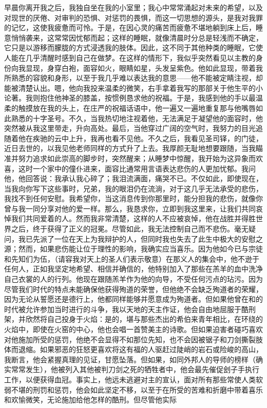 早晨你离开我之后，我独自坐在我的小室里；我心中常常涌起对未来的希望，以及对现世的厌倦、对审判的恐惧、对惩罚的畏惧，而这一切思想的源头，是我对我罪的记忆，这使我疲惫而可怜。于是，在因心灵的痛苦而疲惫不堪地躺到床上后，睡意悄悄袭来，这常常因忧郁而起；这样的睡眠，就像清晨时分总是轻浅而不确定，它只是以游移而朦胧的方式浸透我的肢体。因此，这不同于其他种类的睡眠，它使人能在几乎清醒时感到自己在做梦。在这样的情形下，我似乎突然看见以主教的身份向我显现，身穿白袍，面容如火，眼睛如星，头发呈紫色。他如此显现，带着我所熟悉的容貌和身形，以至于我几乎难以表达我的意思——他不能被定睛注视，却能被清楚认出。嗯，他向我投来温柔的微笑，右手拿着我写的那部关于他生平的小论著。我则抱住他神圣的膝盖，按惯例恳求他的祝福。于是，我感到他的手以最温柔的触摸放在我的头上，在庄严的祝福话语中，他一遍又一遍地重复那与他嘴唇如此熟悉的十字圣号。不久，当我热切地注视着他，无法满足于凝望他的面容时，他突然被从我这里带走，升向高处。最后，当他穿过广阔的空气时，我努力的目光追随着他在疾驰的云中上升，我再也看不见他。不久之后，我看见圣司铎，的门徒，近日去世的，以我见他老师同样的方式升了上去。我厚颜无耻地想要跟随，当我瞄准并努力追求如此崇高的脚步时，突然醒来；从睡梦中惊醒，我开始为这异象而欢喜，这时一个家中的僮仆进来，面容比通常用言语表达悲伤的人更加忧郁。我问他，他回答说：我承认我心碎了；我泪流满面，痛哭不已。不仅如此，即使现在，当我向你写下这些事时，兄弟，我的眼泪仍在流淌，对于这几乎无法承受的悲伤，我找不到任何安慰。我希望你，当这消息传到你那里时，能分担我的悲伤，就像你曾与我一同分享对他的爱一样。那么，我恳求你，立即到我这里来，让我们共同哀悼我们共同爱着的人。然而我非常清楚，这样的人不应被哀悼，他在战胜并得胜世界之后，终于获得了正义的冠冕。尽管如此，我无法控制自己而不悲伤。毫无疑问，我已先派了一位在天上为我辩护的人，但同时我也失去了此生中极大的安慰之源；然而，如果悲伤能让位于理性的影响，我确实应当喜乐。因为他如今已与宗徒和先知们为伍，（请容我对天上的圣人们表示敬意）在那义人的集会中，他不逊于任何人，正如我坚定地希望、相信并确信的，他特别加入了那些在羔羊的血中洗净自己衣裳的人的行列。他现在跟随羔羊作为他的向导，不受任何污点的玷污。因为尽管我们时代的特点未能确保他获得殉道的荣誉，但他绝不会缺乏殉道者的荣耀，因为无论从誓愿还是德行上，他都同样能够并愿意成为殉道者。但如果他曾在和的时代被允许参加当时进行的斗争，我以天地的天主作证，他会自由地屈服于酷刑架，并欣然将自己投身于火焰：是的，堪与那些杰出的希伯来青年相比，在环绕的火焰中，即使在火窑的中心，他也会唱一首赞美主的诗歌。但如果迫害者碰巧喜欢对他施加所受的惩罚，他绝不会显得不如那位先知，也不会因被锯子和刀剑撕裂肢体而退缩。如果邪恶的狂怒更喜欢将这有福的人驱赶过陡峭的岩石或险峻的高山，我断言，他会紧握真理的见证，甘愿坠落。但如果，如同外邦人的导师的榜样（确实常常发生），他被列入其他被判刀剑之死的牺牲者中，他会最先催促刽子手执行工作，以便获得血冠。事实上，他远未逃避对主的宣认，面对所有那些常使人类软弱不堪的刑罚和惩罚，他会如此坚定不移，以至于在所受的苦难和折磨中带着喜乐和欢愉微笑，无论施加给他怎样的酷刑。但尽管他实际